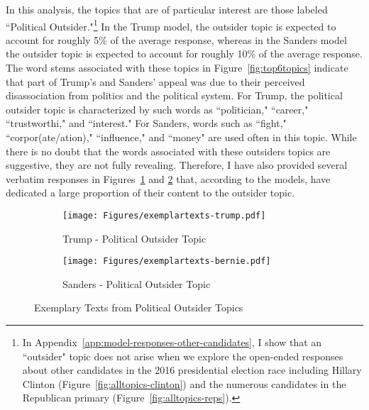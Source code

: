 \documentclass[12pt]{article}
\begin{document}
In this analysis, the topics that are of particular interest are those labeled ``Political Outsider."\footnote{In Appendix~\ref{app:model-responses-other-candidates}, I show that an ``outsider" topic does not arise when we explore the open-ended responses about other candidates in the 2016 presidential election race including Hillary Clinton (Figure~\ref{fig:alltopics-clinton}) and the numerous candidates in the Republican primary (Figure~\ref{fig:alltopics-reps}).} In the Trump model, the outsider topic is expected to account for roughly 5\% of the average response, whereas in the Sanders model the outsider topic is expected to account for roughly 10\% of the average response. The word stems associated with these topics in Figure~\ref{fig:top6topics} indicate that part of Trump's and Sanders' appeal was due to their perceived disassociation from politics and the political system. For Trump, the political outsider topic is characterized by such words as ``politician," ``career," ``trustworthi," and ``interest." For Sanders, words such as ``fight," ``corpor(ate/ation)," ``influence," and ``money" are used often in this topic. While there is no doubt that the words associated with these outsiders topics are suggestive, they are not fully revealing. Therefore, I have also provided several verbatim responses in Figures~\ref{fig:exemplartexts-trump} and \ref{fig:exemplartexts-bernie} that, according to the models, have dedicated a large proportion of their content to the outsider topic. 

\begin{figure}[thp!]
\centering
   \begin{subfigure}[b]{0.45\textwidth}
	   \centering
	   \texttt{[image: Figures/exemplartexts-trump.pdf]}
	   \caption{{\small Trump - Political Outsider Topic}}
	   \label{fig:exemplartexts-trump} 
	\end{subfigure}
	\begin{subfigure}[b]{0.45\textwidth}
		\centering
	   \texttt{[image: Figures/exemplartexts-bernie.pdf]}
	   \caption{{\small Sanders - Political Outsider Topic}}
	   \label{fig:exemplartexts-bernie}
	\end{subfigure}
	\caption{Exemplary Texts from Political Outsider Topics}\label{fig:exemplartexts}
	\vspace{-.25cm}
\end{figure}
\end{document}
